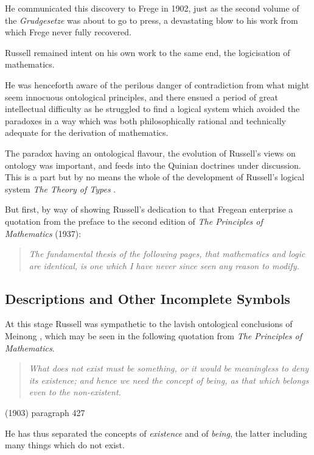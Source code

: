 \documentclass[10pt,titlepage]{article}
\begin{document}
He communicated this discovery to Frege in 1902, just as the second volume of the {\it Grudgesetze} was about to go to press, a devastating blow to his work from which Frege never fully recovered.

Russell remained intent on his own work to the same end, the logicisation of mathematics.

He was henceforth aware of the perilous danger of contradiction from what might seem innocuous ontological principles, and there ensued a period of great intellectual difficulty as he struggled to find a logical system which avoided the paradoxes in a way which was both philosophically rational and technically adequate for the derivation of mathematics.

The paradox having an ontological flavour, the evolution of Russell's views on ontology was important, and feeds into the Quinian doctrines under discussion.
This is a part but by no means the whole of the development of Russell's logical system {\it The Theory of Types} \cite{russell1908}.

But first, by way of showing Russell's dedication to that Fregean enterprise a quotation from the preface to the second edition of {\it The Principles of Mathematics} (1937):

\begin{quote}
  {\it The fundamental thesis of the following pages, that mathematics and logic are identical, is one which I have never since seen any reason to modify.
  }
\end{quote}

\subsection{Descriptions and Other Incomplete Symbols}

At this stage Russell was sympathetic to the lavish ontological conclusions of Meinong \cite{meinong-gegenstandstheorie-a,meinong-gegenstandstheorie-b}, which may be seen in the following quotation from {\it The Principles of Mathematics}.

\begin{quote}
  {\it What does not exist must be something, or it would be meaningless to deny its existence; and hence we need the concept of being, as that which belongs even to the non-existent.}
\end{quote}
(1903) paragraph 427\cite{russell03}

He has thus separated the concepts of {\it existence} and of {\it being}, the latter including many things which do not exist.
\end{document}
